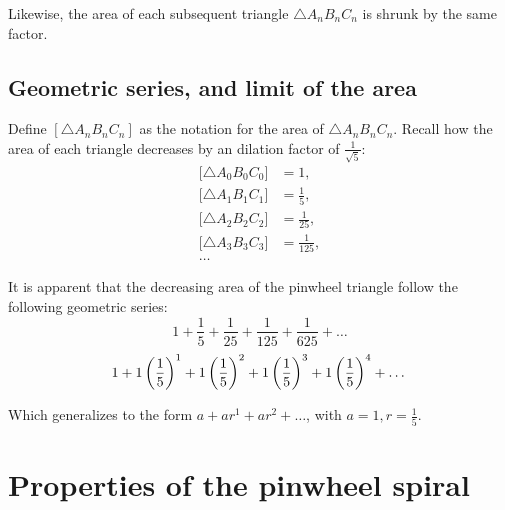 \noindent
Likewise, the area of each subsequent triangle $\triangle A_{n}B_{n}C_{n}$ is shrunk by the same factor.

\subsection{Geometric series, and limit of the area}
Define $[\triangle A_{n}B_{n}C_{n}]$ as the notation for the area of $\triangle A_{n}B_{n}C_{n}$. Recall how the area of each triangle decreases by an dilation factor of $\frac{1}{\sqrt{5}}$:
\begin{equation}
    \begin{aligned}
        \big[\triangle A_{0}B_{0}C_{0}\big] &= 1,\\
        \big[\triangle A_{1}B_{1}C_{1}\big] &= \frac{1}{5},\\
        \big[\triangle A_{2}B_{2}C_{2}\big] &= \frac{1}{25},\\
        \big[\triangle A_{3}B_{3}C_{3}\big] &= \frac{1}{125},\\
        \ldots
    \end{aligned}
\end{equation}

\noindent
It is apparent that the decreasing area of the pinwheel triangle follow the following geometric series:
\begin{equation}
    1 + \frac{1}{5} + \frac{1}{25} + \frac{1}{125} + \frac{1}{625} + \ldots
\end{equation}
\begin{equation}
    1 + 1\left(\frac{1}{5}\right)^1 + 1\left(\frac{1}{5}\right)^2 + 1\left(\frac{1}{5}\right)^3 + 1\left(\frac{1}{5}\right)^4 + \ldots \\
\end{equation}

\noindent
Which generalizes to the form $a + ar^1 + ar^2 + \ldots$, with $a = 1, r = \frac{1}{5}$.

\section{Properties of the pinwheel spiral}
